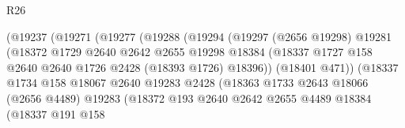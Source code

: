 \begin{lexlean}{R26}
\begin{coremodule}
                                  (@19237
                                    (@19271
                                      (@19277
                                        (@19288
                                          (@19294
                                            (@19297
                                              (@2656 @19298)
                                              @19281
                                              (@18372
                                                @1729
                                                @2640
                                                @2642
                                                @2655
                                                @19298
                                                @18384
                                                (@18337
                                                  @1727
                                                  @158
                                                  @2640
                                                  @2640
                                                  @1726
                                                  @2428
                                                  (@18393 @1726)
                                                  @18396))
                                              (@18401 @471))
                                            (@18337
                                              @1734
                                              @158
                                              @18067
                                              @2640
                                              @19283
                                              @2428
                                              (@18363
                                                @1733
                                                @2643
                                                @18066
                                                (@2656 @4489)
                                                @19283
                                                (@18372
                                                  @193
                                                  @2640
                                                  @2642
                                                  @2655
                                                  @4489
                                                  @18384
                                                  (@18337
                                                    @191
                                                    @158

\end{coremodule}
\end{lexlean}
